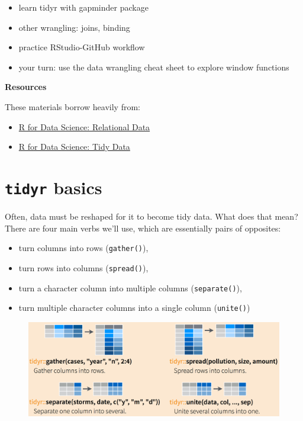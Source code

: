 \documentclass[]{book}
\providecommand{\tightlist}{%
  \setlength{\itemsep}{0pt}\setlength{\parskip}{0pt}}
\theoremstyle{definition}
\theoremstyle{definition}
\theoremstyle{definition}
\theoremstyle{remark}
\begin{document}
\begin{itemize}
\tightlist
\item
  learn tidyr with gapminder package
\item
  other wrangling: joins, binding
\item
  practice RStudio-GitHub workflow
\item
  your turn: use the data wrangling cheat sheet to explore window
  functions
\end{itemize}

\textbf{Resources}

These materials borrow heavily from:

\begin{itemize}
\tightlist
\item
  \href{http://r4ds.had.co.nz/relational-data}{R for Data Science:
  Relational Data}
\item
  \href{http://r4ds.had.co.nz/tidy-data.html\#spreading-and-gathering}{R
  for Data Science: Tidy Data}
\end{itemize}

\section{\texorpdfstring{\texttt{tidyr}
basics}{tidyr basics}}\label{tidyr-basics}

Often, data must be reshaped for it to become tidy data. What does that
mean? There are four main verbs we'll use, which are essentially pairs
of opposites:

\begin{itemize}
\tightlist
\item
  turn columns into rows (\texttt{gather()}),
\item
  turn rows into columns (\texttt{spread()}),
\item
  turn a character column into multiple columns (\texttt{separate()}),
\item
  turn multiple character columns into a single column
  (\texttt{unite()})
\end{itemize}

\begin{figure}
\centering
\includegraphics{img/rstudio-cheatsheet-spread-gather-sep-unite.png}
\caption{}
\end{figure}
\end{document}
